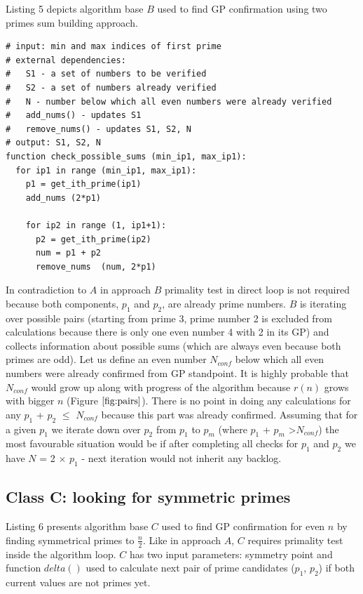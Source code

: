 \documentclass[10pt,twocolumn]{article}
\begin{document}
Listing 5 depicts algorithm base $B$ used to find GP confirmation using two primes sum building approach. \par

\lstset{language=Python}
\lstset{breaklines=true}
\lstset{frame=shadowbox}
\begin{lstlisting}[linewidth=8.7cm]
# input: min and max indices of first prime
# external dependencies:
#   S1 - a set of numbers to be verified
#   S2 - a set of numbers already verified
#   N - number below which all even numbers were already verified
#   add_nums() - updates S1
#   remove_nums() - updates S1, S2, N
# output: S1, S2, N
function check_possible_sums (min_ip1, max_ip1):
  for ip1 in range (min_ip1, max_ip1):
    p1 = get_ith_prime(ip1)
    add_nums (2*p1)
    
    for ip2 in range (1, ip1+1):
      p2 = get_ith_prime(ip2)
      num = p1 + p2
      remove_nums  (num, 2*p1)
\end{lstlisting}

In contradiction to $A$ in approach $B$ primality test in direct loop is not required because both components, $p_1$ and $p_2$, are already prime numbers. $B$ is iterating over possible pairs (starting from prime 3, prime number 2 is excluded from calculations because there is only one even number 4 with 2 in its GP) and collects information about possible sums (which are always even because both primes are odd). Let us define an even number $N_{conf}$ below which all even numbers were already confirmed from GP standpoint. It is highly probable that $N_{conf}$ would grow up along with progress of the algorithm because $r(n)$ grows with bigger $n$ (Figure $\ref{fig:pairs}$). There is no point in doing any calculations for any $p_1$ + $p_2$ $\leq$ $N_{conf}$ because this part was already confirmed. Assuming that for a given $p_1$ we iterate down over $p_2$ from $p_1$ to $p_m$ (where $p_1$ + $p_m$ \textgreater $N_{conf}$) the most favourable situation would be if after completing all checks for $p_1$ and $p_2$ we have $N$ = 2 $\times$ $p_1$ - next iteration would not inherit any backlog.

\subsection{Class C: looking for symmetric primes}

Listing 6 presents algorithm base $C$ used to find GP confirmation for even $n$ by finding symmetrical primes to $\frac{n}{2}$. Like in approach $A$, $C$ requires primality test inside the algorithm loop. $C$ has two input parameters: symmetry point and function $delta()$ used to calculate next pair of prime candidates ($p_1$, $p_2$) if both current values are not primes yet. \par
\end{document}
